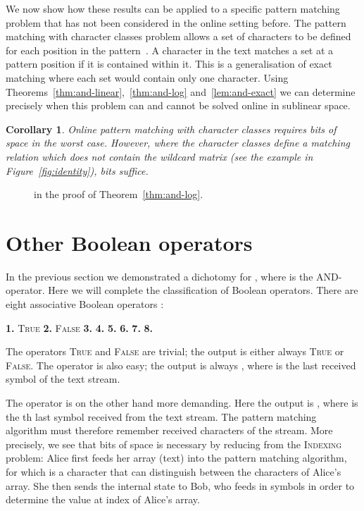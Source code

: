\documentclass{article}
\newcommand{\TRUE}{\textsc{True}\xspace}
\newcommand{\FALSE}{\textsc{False}\xspace}
\newcommand{\indexing}{\textsc{Indexing}\xspace}
\theoremstyle{plain}
\newtheorem{corollary}[theorem]{Corollary}
\theoremstyle{definition}
\begin{document}
We now show how these results can be applied to a specific pattern matching problem that has not been considered in the online setting before. The pattern matching with character classes problem allows a set of characters to be defined for each position in the pattern~\cite{LR:2009}.  A character in the text matches a set at a pattern position if it is contained within it.  This is a generalisation of exact matching where each set would contain only one character. Using Theorems~\ref{thm:and-linear},~\ref{thm:and-log} and~\ref{lem:and-exact} we can determine precisely when this problem can and cannot be solved online in sublinear space.

\begin{corollary}
    Online pattern matching with character classes requires  bits of space in the worst case. However, where the character classes define a matching relation  which does not contain the wildcard matrix (see the example in Figure~\ref{fig:identity}),  bits suffice.
\end{corollary}

\begin{figure}[t]
        
        \caption{\label{fig:and-log} in the proof of Theorem~\ref{thm:and-log}.}
\end{figure}


\section{Other Boolean operators} \label{sec:otherbool}

In the previous section we demonstrated a dichotomy for , where  is the AND-operator. Here we will complete the classification of Boolean operators. There are eight associative Boolean operators :

\medskip
\noindent
\hfill
\textbf{1.} \TRUE \hfill
\textbf{2.} \FALSE \hfill
\textbf{3.}  \hfill
\textbf{4.}  \hfill
\textbf{5.}  \hfill
\textbf{6.}  \hfill
\textbf{7.}  \hfill
\textbf{8.}  \hfill

\medskip
The operators \TRUE and \FALSE are trivial; the output is either always \TRUE or \FALSE. The operator  is also easy; the output is always , where  is the last received symbol of the text stream.

The operator  is on the other hand more demanding. Here the output is , where  is the th last symbol received from the text stream. The pattern matching algorithm must therefore remember  received characters of the stream. More precisely, we see that  bits of space is necessary by reducing from the \indexing problem: Alice first feeds her array (text) into the pattern matching algorithm, for which  is a character that can distinguish between the characters of Alice's array. She then sends the internal state to Bob, who feeds in  symbols in order to determine the value at index  of Alice's array.
\end{document}
